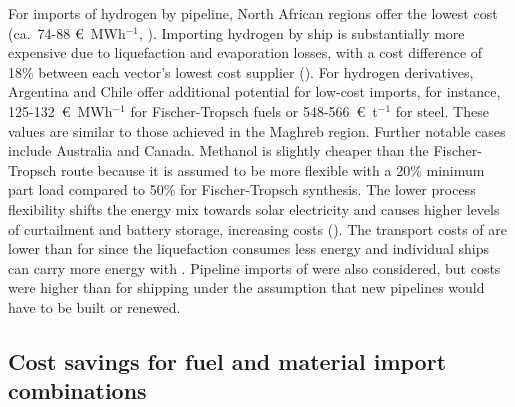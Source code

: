For imports of hydrogen by pipeline, North African regions offer the lowest cost
(ca.~74-88 \euro{}~MWh$^{-1}$, ). Importing hydrogen by ship is
substantially more expensive due to liquefaction and evaporation losses, with a
cost difference of 18\% between each vector's lowest cost supplier
(). For hydrogen derivatives, Argentina and Chile offer
additional potential for low-cost imports, for instance, 125-132~\euro{}~MWh$^{-1}$ for
Fischer-Tropsch fuels or 548-566~\euro{}~t$^{-1}$ for steel. These values are similar
to those achieved in the Maghreb region. Further notable cases include Australia
and Canada. Methanol is slightly cheaper than the Fischer-Tropsch route because
it is assumed to be more flexible with a 20\% minimum part load compared to 50\%
for Fischer-Tropsch synthesis.\cite{brownUltralongdurationEnergyStorage2023} The
lower process flexibility shifts the energy mix towards solar electricity and
causes higher levels of curtailment and battery storage, increasing costs
(). The transport costs of  are lower than
for  since the liquefaction consumes less energy and individual ships
can carry more energy with . Pipeline imports of  were
also considered, but costs were higher than for  shipping under the
assumption that new pipelines would have to be built or renewed.

\begin{figure}
\end{figure}

\subsection*{Cost savings for fuel and material import combinations}

